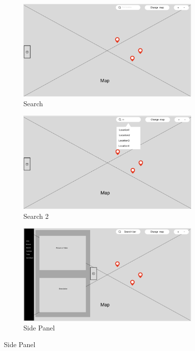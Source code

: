 \begin{figure}[H]
  \vspace{0.5cm}

  \begin{subfigure}[b]{0.3\textwidth}
    \includegraphics[width=\textwidth]{screenshot/wireframe_search.png}
    \caption{Search}
  \end{subfigure}\hfill
  \begin{subfigure}[b]{0.3\textwidth}
    \includegraphics[width=\textwidth]{screenshot/wireframe_search2.png}
    \caption{Search 2}
  \end{subfigure}\hfill
  \begin{subfigure}[b]{0.3\textwidth}
    \includegraphics[width=\textwidth]{screenshot/wireframe_sidepanel.png}
    \caption{Side Panel}
  \end{subfigure}


\end{figure}

